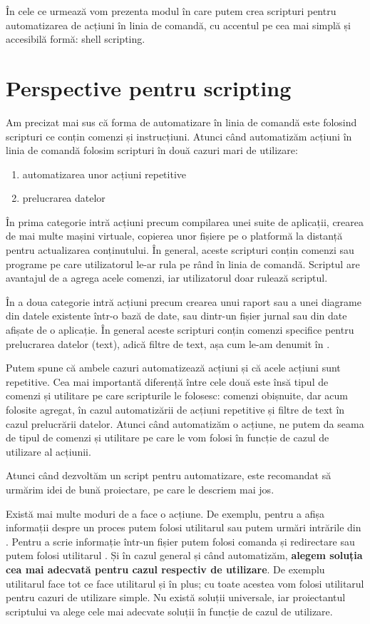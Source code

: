 În cele ce urmează vom prezenta modul în care putem crea scripturi pentru automatizarea de acțiuni în linia de comandă, cu accentul pe cea mai simplă și accesibilă formă: shell scripting.

\section{Perspective pentru scripting}
\label{sec:auto:how}

Am precizat mai sus că forma de automatizare în linia de comandă este folosind scripturi ce conțin comenzi și instrucțiuni.
Atunci când automatizăm acțiuni în linia de comandă folosim scripturi în două cazuri mari de utilizare:
\begin{enumerate}
  \item automatizarea unor acțiuni repetitive
  \item prelucrarea datelor
\end{enumerate}

În prima categorie intră acțiuni precum compilarea unei suite de aplicații, crearea de mai multe mașini virtuale, copierea unor fișiere pe o platformă la distanță pentru actualizarea conținutului.
În general, aceste scripturi conțin comenzi sau programe pe care utilizatorul le-ar rula pe rând în linia de comandă.
Scriptul are avantajul de a agrega acele comenzi, iar utilizatorul doar rulează scriptul.

În a doua categorie intră acțiuni precum crearea unui raport sau a unei diagrame din datele existente într-o bază de date, sau dintr-un fișier jurnal sau din date afișate de o aplicație.
În general aceste scripturi conțin comenzi specifice pentru prelucrarea datelor (text), adică filtre de text, așa cum le-am denumit în .

Putem spune că ambele cazuri automatizează acțiuni și că acele acțiuni sunt repetitive.
Cea mai importantă diferență între cele două este însă tipul de comenzi și utilitare pe care scripturile le folosesc: comenzi obișnuite, dar acum folosite agregat, în cazul automatizării de acțiuni repetitive și filtre de text în cazul prelucrării datelor.
Atunci când automatizăm o acțiune, ne putem da seama de tipul de comenzi și utilitare pe care le vom folosi în funcție de cazul de utilizare al acțiunii.

Atunci când dezvoltăm un script pentru automatizare, este recomandat să urmărim idei de bună proiectare, pe care le descriem mai jos.

Există mai multe moduri de a face o acțiune.
De exemplu, pentru a afișa informații despre un proces putem folosi utilitarul  sau putem urmări intrările din .
Pentru a scrie informație într-un fișier putem folosi comanda  și redirectare sau putem folosi utilitarul .
Și în cazul general și când automatizăm, \textbf{alegem soluția cea mai adecvată pentru cazul respectiv de utilizare}.
De exemplu utilitarul  face tot ce face utilitarul  și în plus; cu toate acestea vom folosi utilitarul  pentru cazuri de utilizare simple.
Nu există soluții universale, iar proiectantul scriptului va alege cele mai adecvate soluții în funcție de cazul de utilizare.

